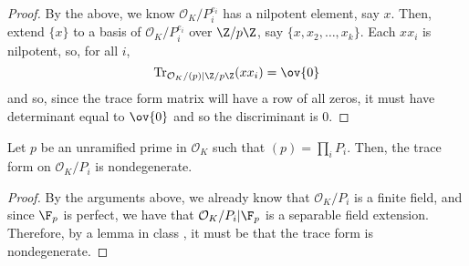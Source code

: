 \documentclass[11pt,leqno,oneside]{amsart}
\numberwithin{thm}{section}
\renewcommand{\O}{\mathcal{O}}
\newcommand{\Tr}{\operatorname{Tr}}
\begin{document}
\begin{proof}
  By the above, we know \(\O_K/P_i^{e_i}\) has a nilpotent element,
  say \(x\). Then, extend \(\{x\}\) to a basis of \(\O_K/P_i^{e_i}\)
  over \(\Z/p\Z\), say \(\{x,x_2, \ldots,
  x_k\}\). Each \(xx_i\) is nilpotent, so, for all \(i\), \[
    \Tr_{\O_K/(p)|\Z/p\Z}(xx_i) = \ov{0}
  \]
  and so, since the trace form matrix will have a row of all zeros, it
  must have determinant equal to \(\ov{0}\) and so the discriminant is \(0\).
\end{proof}
\begin{lem}\label{trace-form-nondeg-on-field-ext}
  Let \(p\) be an unramified prime in \(\O_K\) such that \((p) = \prod_i
  P_i\). Then, the trace form on \(\O_K/P_i\) is nondegenerate.
\end{lem}
\begin{proof}
  By the arguments above, we already know that \(\O_K/P_i\) is a
  finite field, and since \(\F_p\) is perfect, we have that
  \(\O_K/P_i|\F_p\) is a separable field extension. Therefore, by a
  lemma in class , it must be that the trace form is
  nondegenerate. 
\end{proof}
\end{document}
